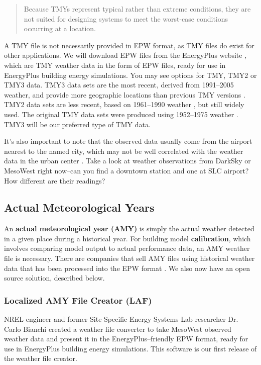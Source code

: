 \documentclass[10pt]{article}
\begin{document}
\begin{quote}
Because TMYs represent typical rather than extreme conditions, they are not suited for designing systems to meet the worst-case conditions occurring at a location. \cite{tmy-nsrdb}
\end{quote}

A TMY file is not necessarily provided in EPW format, as TMY files do exist for other applications. We will download EPW files from the EnergyPlus website \cite{EPweather}, which are TMY weather data in the form of EPW files, ready for use in EnergyPlus building energy simulations. You may see options for TMY, TMY2 or TMY3 data. TMY3 data sets are the most recent, derived from 1991--2005 weather, and provide more geographic locations than previous TMY versions \cite{TMY3user}.  TMY2 data sets are less recent, based on  1961--1990 weather \cite{TMY2user}, but still widely used.  The original TMY data sets were produced using 1952--1975 weather \cite{TMY3user}. TMY3 will be our preferred type of TMY data.

It's also important to note that the observed data usually come from the airport nearest to the named city, which may not be well correlated with the weather data in the urban center \cite{Carlo1}. Take a look at weather observations from DarkSky \cite{DarkSky} or MesoWest \cite{MesoWest} right now--can you find a downtown station and one at SLC airport? How different are their readings?

\subsection{Actual Meteorological Years}

An \textbf{actual meteorological year (AMY)} is simply the actual weather detected in a given place during a historical year. For building model \textbf{calibration}, which involves comparing model output to actual performance data, an AMY weather file is necessary. There are companies that sell AMY files using historical weather data that has been processed into the EPW format \cite{noauthor_undated-vj}. We also now have an open source solution, described below.

\subsubsection{Localized AMY File Creator (LAF)}

NREL engineer and former Site-Specific Energy Systems Lab researcher Dr. Carlo Bianchi created a weather file converter to take MesoWest \cite{MesoWest} observed weather data and present it in the EnergyPlus--friendly EPW format, ready for use in EnergyPlus building energy simulations. This software is our first release of the weather file creator.
\end{document}
